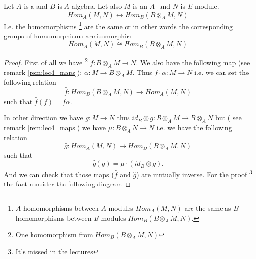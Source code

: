 \begin{theorem}
  Let $A$ is a  and $B$ is $A$-algebra. Let also $M$
  is an $A$- and $N$ is $B$-module.
  \[
  Hom_A\left(M, N\right)
  \leftrightarrow
  Hom_B\left(B \otimes_A M, N\right)
  \]
  I.e. the homomorphisms
  \footnote{
    $A$-homomorphisms between $A$ modules $Hom_A\left(M, N\right)$ are the
    same as $B$-homomorphisms between $B$ modules
    $Hom_B\left(B \otimes_A M, N\right)$.
  }
  are the same or in other words the
  corresponding groups of homomorphisms are isomorphic:
  \[
  Hom_A\left(M, N\right)
  \cong
  Hom_B\left(B \otimes_A M, N\right)
  \]

  
  \begin{proof}
    First of all we have
    \footnote{
      One homomorphism from  $Hom_B\left(B \otimes_A M, N\right)$
    }
     $f: B \otimes_A M \to N$. We also have
    the following map (see remark \ref{rem:lec4_maps}):
    $\alpha: M \to B \otimes_A M$. 
    Thus $f \cdot \alpha: M \to N$ i.e.
    we can set the following relation
    \[
    \hat{f} : Hom_B\left(B \otimes_A M, N\right)
    \to Hom_A\left(M, N\right)
    \]
    such that $\hat{f}\left(f\right) = f \alpha$.

    In other direction we have $g: M \to N$ thus
    $id_B \otimes g: B \otimes_A M \to B \otimes_A N$ but
    ( see remark \ref{rem:lec4_maps}) we have
    $\mu: B \otimes_A N \to N$ i.e. we have the following relation
    \[
    \hat{g} : Hom_A\left(M, N\right) \to
    Hom_B\left(B \otimes_A M, N\right)
    \]
    such that
    \[
    \hat g(g) = \mu \cdot (id_B \otimes g).
    \]   
    And we can check that those maps ($\hat{f}$ and $\hat{g}$) are
    mutually inverse. For the proof
    \footnote{
      It's missed in the lectures
    }
    the fact consider the following diagram
    
    

\end{proof}
\end{theorem}
